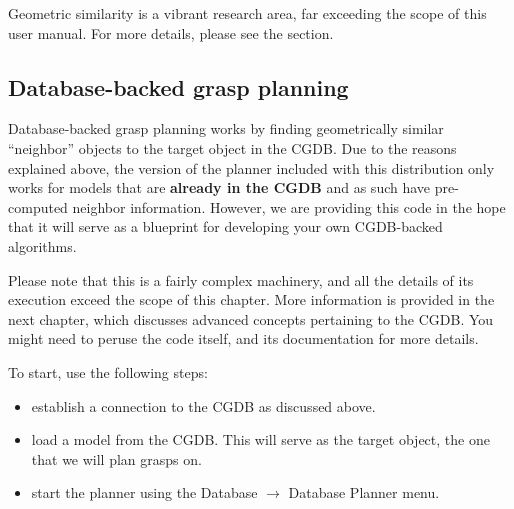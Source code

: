 Geometric similarity is a vibrant research area, far exceeding the
scope of this user manual. For more details, please see the
 section.

\subsection{Database-backed grasp planning}

Database-backed grasp planning works by finding geometrically similar
``neighbor'' objects to the target object in the CGDB. Due to the
reasons explained above, the version of the planner included with this
distribution only works for models that are \textbf{already in the
  CGDB} and as such have pre-computed neighbor information. However,
we are providing this code in the hope that it will serve as a
blueprint for developing your own CGDB-backed algorithms.

Please note that this is a fairly complex machinery, and all the
details of its execution exceed the scope of this chapter. More
information is provided in the next chapter, which discusses advanced
concepts pertaining to the CGDB. You might need to peruse the code
itself, and its documentation for more details.

To start, use the following steps:
\begin{itemize}
\item establish a connection to the CGDB as discussed above.
\item load a model from the CGDB. This will serve as the target
  object, the one that we will plan grasps on.
\item start the planner using the Database $\rightarrow$ Database
  Planner menu.
\end{itemize}

